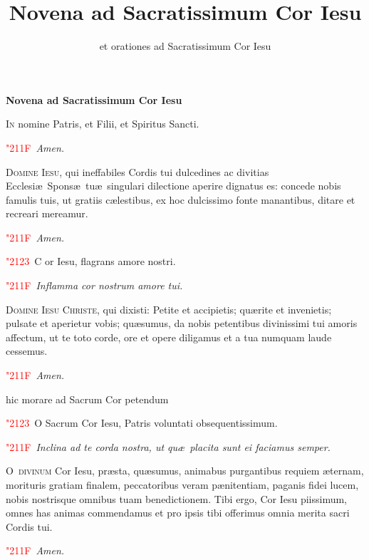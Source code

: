 \documentclass[12pt]{article}\errorcontextlines=9
\title{Novena ad Sacratissimum Cor Iesu}
\author{et orationes ad Sacratissimum Cor Iesu}
\newcommand\centerheading[1]{%
\begin{center}
\normalsize\textbf{#1}\\%
\end{center}
}
\newcommand\versic[1]{%
\textcolor{red}{\char"2123\ }#1%
}
\newcommand\response[1]{%
\textcolor{red}{\char"211F\ }#1%
}
\begin{document}
\centerheading{\LARGE{\color{red}Novena ad Sacratissimum Cor Iesu}}

\bigskip

\begin{multicols}{2}

\lettrine{I}{\color{red}n} nomine Patris, et Filii, et Spiritus Sancti.

\response \textit{Amen.}

\bigskip

\lettrine{D}{\color{red}omine Iesu}, qui ineffabiles Cordis tui dulcedines ac divitias Ecclesi\ae\ Spons\ae\ tu\ae\ 
singulari dilectione aperire dignatus es: concede nobis famulis tuis, ut gratiis c\ae lestibus, ex hoc dulcissimo fonte manantibus, 
ditare et recreari mereamur.

\response \textit{Amen.}

\bigskip

\versic Cor Iesu, flagrans amore nostri.

\response \textit{Inflamma cor nostrum amore tui.}

\bigskip

\lettrine{D}{\color{red}omine Iesu Christe}, qui dixisti: Petite et accipietis; qu\ae rite et invenietis; pulsate et aperietur vobis; 
qu\ae sumus, da nobis petentibus divinissimi tui amoris affectum, ut te toto corde, ore et opere diligamus et a tua numquam laude cessemus.

\response \textit{Amen.}

\bigskip

{\color{red}\scriptsize{hic morare ad Sacrum Cor petendum}}

\bigskip

\versic O Sacrum Cor Iesu, Patris voluntati obsequentissimum.

\response \textit{Inclina ad te corda nostra, ut qu\ae\ placita sunt ei faciamus semper.}

\columnbreak

\lettrine{O}{\color{red}\ divinum} Cor Iesu, pr\ae sta, qu\ae sumus, animabus purgantibus requiem \ae ternam, morituris gratiam finalem, 
peccatoribus veram p\ae nitentiam, paganis fidei lucem, nobis nostrisque omnibus tuam benedictionem. 
Tibi ergo, Cor Iesu piissimum, omnes has animas commendamus et pro ipsis tibi offerimus omnia merita sacri Cordis tui.

\response \textit{Amen.}

\bigskip


\end{multicols}
\end{document}
